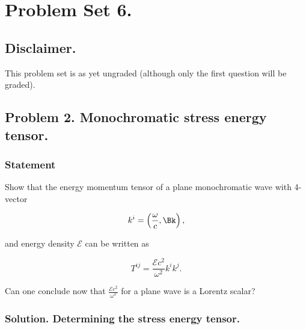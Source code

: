 
\usepackage{cancel}
%

\chapter{Problem Set 6.}
\label{chap:relElectroDynProblemSet6}
\date{Mar 25, 2011}

\beginArtWithToc

\section{Disclaimer.}

This problem set is as yet ungraded (although only the first question will be graded).



\section{Problem 2.  Monochromatic stress energy tensor.}
\subsection{Statement}

Show that the energy momentum tensor of a plane monochromatic wave with 4-vector

\begin{equation}\label{eqn:relativisticElectrodynamicsPS6:10}
k^i = \left( \frac{\omega}{c}, \Bk \right),
\end{equation}

and energy density $\mathcal{E}$ can be written as

\begin{equation}\label{eqn:relativisticElectrodynamicsPS6:20}
T^{i j} = \frac{\mathcal{E} c^2}{\omega^2} k^i k^j.
\end{equation}

Can one conclude now that $\frac{\mathcal{E} c^2}{\omega^2}$ for a plane wave is a Lorentz scalar?

\subsection{Solution.  Determining the stress energy tensor.}

